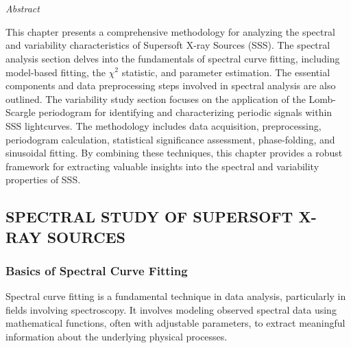 \chapter{\MakeUppercase{\ChapterTitleTwo}} \label{chap:methodology}
    \minitoc
    
    \newpage
    \begin{center}
    	\emph{Abstract}
    \end{center}
    
    This chapter presents a comprehensive methodology for analyzing the spectral and variability characteristics of Supersoft X-ray Sources (SSS). The spectral analysis section delves into the fundamentals of spectral curve fitting, including model-based fitting, the $\chi^2$ statistic, and parameter estimation. The essential components and data preprocessing steps involved in spectral analysis are also outlined. The variability study section focuses on the application of the Lomb-Scargle periodogram for identifying and characterizing periodic signals within SSS lightcurves. The methodology includes data acquisition, preprocessing, periodogram calculation, statistical significance assessment, phase-folding, and sinusoidal fitting. By combining these techniques, this chapter provides a robust framework for extracting valuable insights into the spectral and variability properties of SSS.
    
    \newpage
    \section{\MakeUppercase{Spectral Study of Supersoft X-ray Sources}} \label{methodology:spectral}
    	
    	\subsection{Basics of Spectral Curve Fitting}
    		Spectral curve fitting is a fundamental technique in data analysis, particularly in fields involving spectroscopy. It involves modeling observed spectral data using mathematical functions, often with adjustable parameters, to extract meaningful information about the underlying physical processes.

